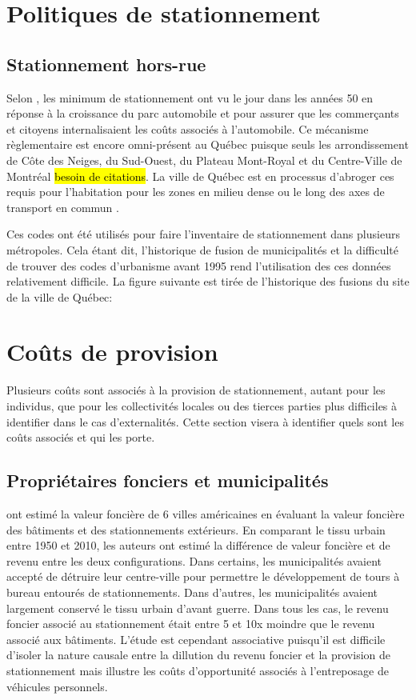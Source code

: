 \section{Politiques de stationnement}
\subsection{Stationnement hors-rue}
Selon \textcite{Shoup:HighCost:2005}, les minimum de stationnement ont vu le jour dans les années 50 en réponse à la croissance du parc automobile et pour assurer que les commerçants et citoyens internalisaient les coûts associés à l'automobile. Ce mécanisme règlementaire est encore omni-présent au Québec puisque seuls les arrondissement de Côte des Neiges, du Sud-Ouest, du Plateau Mont-Royal et du Centre-Ville de Montréal \hl{besoin de citations}. La ville de Québec est en processus d'abroger ces requis pour l'habitation pour les zones en milieu dense ou le long des axes de transport en commun \parencite{VilledeQuebec:AdoptionReglement:2024}.\par

Ces codes ont été utilisés pour faire l'inventaire de stationnement dans plusieurs métropoles. Cela étant dit, l'historique de fusion de municipalités et la difficulté de trouver des codes d'urbanisme avant 1995 rend l'utilisation des ces données relativement difficile. La figure suivante est tirée de l'historique des fusions du site de la ville de Québec:


\section{Coûts de provision}
Plusieurs coûts sont associés à la provision de stationnement, autant pour les individus, que pour les collectivités locales ou des tierces parties plus difficiles à identifier dans le cas d'externalités. Cette section visera à identifier quels sont les coûts associés et qui les porte.

\subsection{Propriétaires fonciers et municipalités}

\textcite{Blanc:EffectsUrban:2014} ont estimé la valeur foncière de 6 villes américaines en évaluant la valeur foncière des bâtiments et des stationnements extérieurs. En comparant le tissu urbain entre 1950 et 2010, les auteurs ont estimé la différence de valeur foncière et de revenu entre les deux configurations. Dans certains, les municipalités avaient accepté de détruire leur centre-ville pour permettre le développement de tours à bureau entourés de stationnements. Dans d'autres, les municipalités avaient largement conservé le tissu urbain d'avant guerre. Dans tous les cas, le revenu foncier associé au stationnement était entre 5 et 10x moindre que le revenu associé aux bâtiments. L'étude est cependant associative puisqu'il est difficile d'isoler la nature causale entre la dillution du revenu foncier et la provision de stationnement mais illustre les coûts d'opportunité associés à l'entreposage de véhicules personnels. \par

